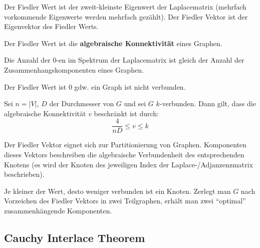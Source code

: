 \begin{definition}
    Der Fiedler Wert ist der zweit-kleinste Eigenwert der Laplacematrix (mehrfach vorkommende Eigenwerte werden mehrfach gezählt).
    Der Fiedler Vektor ist der Eigenvektor des Fiedler Werts.

    Der Fiedler Wert ist die \textbf{algebraische Konnektivität} eines Graphen.
\end{definition}

\begin{proposition}
    Die Anzahl der 0-en im Spektrum der Laplacematrix ist gleich der Anzahl der Zusammenhangskomponenten eines Graphen.
\end{proposition}

\begin{corollary}
    Der Fiedler Wert ist 0 gdw. ein Graph ist nicht verbunden.
\end{corollary}

\begin{observation}
    Sei $ n = |V| $, $ D $ der Durchmesser von $ G $ und sei $ G $ $ k $-verbunden.
    Dann gilt, dass die algebraische Konnektivität $ v $ beschränkt ist durch:
    \begin{equation*}
        \frac{4}{nD} \leq v \leq k
    \end{equation*}
\end{observation}

\begin{observation}
    Der Fiedler Vektor eignet sich zur Partitionierung von Graphen.
    Komponenten dieses Vektors beschreiben die algebraische Verbundenheit des entsprechenden Knotens (es wird der Knoten des jeweiligen Index der Laplace-/Adjanzenzmatrix beschrieben).

    Je kleiner der Wert, desto weniger verbunden ist ein Knoten.
    Zerlegt man $ G $ nach Vorzeichen des Fiedler Vektors in zwei Teilgraphen, erhält man zwei ``optimal'' zusammenhängende Komponenten.
\end{observation}

\subsection{Cauchy Interlace Theorem}

